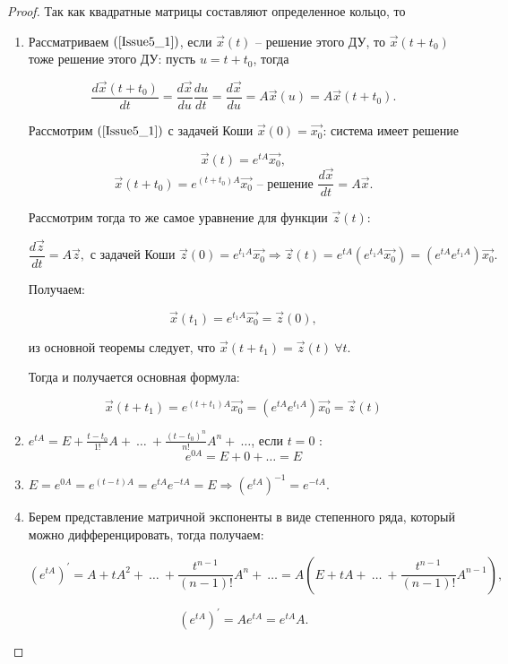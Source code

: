 \begin{proof}

Так как квадратные матрицы составляют определенное кольцо, то \\

\begin{enumerate}

	\item Рассматриваем $(\ref{Issue5_1})$, если $\overrightarrow{x}(t)$ -- решение этого ДУ, то $\overrightarrow{x}(t+t_0)$ тоже решение этого ДУ: пусть $u = t + t_0$, тогда

	\[ \frac{d\overrightarrow{x}(t+t_0)}{dt} = \frac{d\overrightarrow{x}}{du}\frac{du}{dt} = \frac{d\overrightarrow{x}}{du} = A\overrightarrow{x}(u) = A\overrightarrow{x}(t+t_0).\]

	Рассмотрим $(\ref{Issue5_1})$ с задачей Коши $\overrightarrow{x}(0) = \overrightarrow{x_0}$: система имеет решение

	\[ \overrightarrow{x}(t) =  e^{tA}\overrightarrow{x_0},\]
	\[ \overrightarrow{x}(t+t_0) = e^{(t+t_0)A}\overrightarrow{x_0}\text{ -- решение }\frac{d\overrightarrow{x}}{dt} = A\overrightarrow{x}. \]

	Рассмотрим тогда то же самое уравнение для функции $\overrightarrow{z}(t)$:

	\[ \frac{d\overrightarrow{z}}{dt} = A\overrightarrow{z}, \text{ с задачей Коши } \overrightarrow{z}(0) = e^{t_1A}\overrightarrow{x_0} \Rightarrow \overrightarrow{z}(t) = e^{tA} (e^{t_1A}\overrightarrow{x_0}) = (e^{tA}e^{t_1A})\overrightarrow{x_0}.\]

	Получаем:

	\[ \overrightarrow{x}(t_1) = e^{t_1A}\overrightarrow{x_0} = \overrightarrow{z}(0),\]

	из основной теоремы следует, что $\overrightarrow{x}(t+t_1) = \overrightarrow{z}(t)\ \forall t$.

	Тогда и получается основная формула:

	\[ \overrightarrow{x}(t+t_1) = e^{(t+t_1)A}\overrightarrow{x_0} = (e^{tA}e^{t_1A})\overrightarrow{x_0} = \overrightarrow{z}(t)\]

	\item $ e^{tA} = E + \frac{t-t_0}{1!}A +\ \dots\ + \frac{(t-t_0)^n}{n!}A^n+\ \dots $, если $t = 0$ :
	\[ e^{0A} = E + 0 + \dots = E\]

	\item $E = e^{0A} = e^{(t-t)A} = e^{tA}e^{-tA} = E \Rightarrow \left(e^{tA}\right)^{-1} = e^{-tA}.$

	\item Берем представление матричной экспоненты в виде степенного ряда, который можно дифференцировать, тогда получаем:

	\[ (e^{tA})^{'} = A + tA^2 +\ \dots\ +\frac{t^{n-1}}{(n-1)!} A^n +\ \dots = A\left(E + tA +\ \dots\ + \frac{t^{n-1}}{(n-1)!}A^{n-1}\right),\]

	\[ (e^{tA})^{'} = Ae^{tA} = e^{tA}A.\]

\end{enumerate}

\end{proof}

